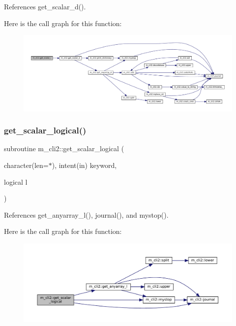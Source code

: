 References get\+\_\+scalar\+\_\+d().

Here is the call graph for this function\+:
\nopagebreak
\begin{figure}[H]
\begin{center}
\leavevmode
\includegraphics[width=350pt]{namespacem__cli2_a9c5208ef6763da7e68dd1e118bea0b7a_cgraph}
\end{center}
\end{figure}
\mbox{\label{namespacem__cli2_a138d07d14246ee532ce36e67719e8c7d}} 
\subsubsection{\texorpdfstring{get\+\_\+scalar\+\_\+logical()}{get\_scalar\_logical()}}
{\footnotesize\ttfamily subroutine m\+\_\+cli2\+::get\+\_\+scalar\+\_\+logical (\begin{DoxyParamCaption}\item[{character(len=$\ast$), intent(in)}]{keyword,  }\item[{logical}]{l }\end{DoxyParamCaption})\hspace{0.3cm}{\ttfamily [private]}}



References get\+\_\+anyarray\+\_\+l(), journal(), and mystop().

Here is the call graph for this function\+:
\nopagebreak
\begin{figure}[H]
\begin{center}
\leavevmode
\includegraphics[width=350pt]{namespacem__cli2_a138d07d14246ee532ce36e67719e8c7d_cgraph}
\end{center}
\end{figure}
\mbox{\label{namespacem__cli2_ad089d91c66626de91bcda84523e80b54}} 
